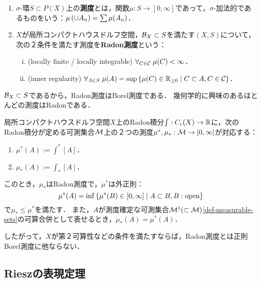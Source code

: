 \documentclass[uplatex,dvipdfmx]{jsreport}
\begin{document}
\begin{definition}\mbox{}\label{def-Radon-measure}
    \begin{enumerate}
        \item $\sigma$-環$S\subset P(X)$上の\textbf{測度}とは，関数$\mu:S\to[0,\infty]$であって，$\sigma$-加法的であるものをいう：$\mu\left(\cup A_n\right)=\sum\mu(A_n)$．
        \item $X$が局所コンパクトハウスドルフ空間，$\mathcal{B}_X\subset S$を満たす$(X,S)$について，次の２条件を満たす測度を\textbf{Radon測度}という：
        \begin{enumerate}[(i)]
            \item (locally finite / locally integrable) $\forall_{C\in\mathcal{C}}\;\mu(C)<\infty$．
            \item (inner regularity) $\forall_{A\in S}\;\mu(A)=\sup\left\{\mu(C)\in\mathbb{R}_{\ge0}\mid C\subset A,C\in\mathcal{C}\right\}$．
        \end{enumerate}
    \end{enumerate}
\end{definition}
\begin{remark}
    $\mathcal{B}_X\subset S$であるから，Radon測度はBorel測度である．
    幾何学的に興味のあるほとんどの測度はRadonである．
\end{remark}

\begin{proposition}[Radon積分からRadon測度の復元]\label{prop-recovery-of-Radon-measure}
    局所コンパクトハウスドルフ空間$X$上のRadon積分$\int:C_c(X)\to\mathbb{R}$に，次のRadon積分が定める可測集合$\mathcal{M}$上の２つの測度$\mu^*,\mu_*:\mathcal{M}\to[0,\infty]$が対応する：
    \begin{enumerate}
        \item $\mu^*(A):=\int^*[A]$．
        \item $\mu_*(A):=\int_*[A]$．
    \end{enumerate}
    このとき，$\mu_*$はRadon測度で，$\mu^*$は外正則：
    \[\mu^*(A)=\inf\left\{\mu^*(B)\in[0,\infty]\mid A\subset B,B:\text{open}\right\}\]
    で$\mu_*\le\mu^*$を満たす．
    また，$A$が測度確定な可測集合$\mathcal{M}^1(\subset\mathcal{M})$\ref{def-measurable-sets}の可算合併として表せるとき，$\mu_*(A)=\mu^*(A)$．
\end{proposition}
\begin{remarks}
    したがって，$X$が第２可算性などの条件を満たすならば，Radon測度とは正則Borel測度に他ならない．
\end{remarks}

\subsection{Rieszの表現定理}
\end{document}
